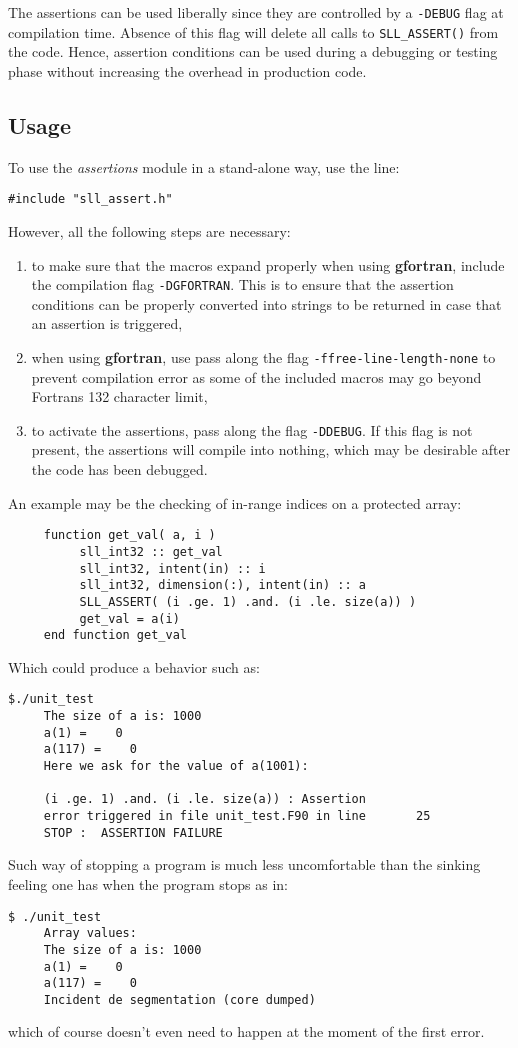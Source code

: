 \documentclass[]{report}   %
\begin{document}
The assertions can be used liberally since they are controlled by a \verb+-DEBUG+ flag at compilation time. Absence of this flag will delete all calls to \verb+SLL_ASSERT()+ from the code. Hence, assertion conditions can be used during a debugging or testing phase without increasing the overhead in production code.

\subsection{Usage}
To use the \emph{assertions} module in a stand-alone way, use the line:
\begin{verbatim}
#include "sll_assert.h"
\end{verbatim}
However, all the following steps are necessary:

\begin{enumerate}
\item to make sure that the macros expand properly when using \textbf{gfortran}, include the compilation flag \verb+-DGFORTRAN+. This is to ensure that the assertion conditions can be properly converted into strings to be returned in case that an assertion is triggered,
\item when using \textbf{gfortran}, use pass along the flag \verb+-ffree-line-length-none+ to prevent compilation error as some of the included macros may go beyond Fortrans 132 character limit,
\item to activate the assertions, pass along the flag \verb+-DDEBUG+. If this flag is not present, the assertions will compile into nothing, which may be desirable after the code has been debugged.
\end{enumerate}
An example may be the checking of in-range indices on a protected array:

\begin{verbatim}
     function get_val( a, i )
          sll_int32 :: get_val
          sll_int32, intent(in) :: i
          sll_int32, dimension(:), intent(in) :: a
          SLL_ASSERT( (i .ge. 1) .and. (i .le. size(a)) )
          get_val = a(i)
     end function get_val
\end{verbatim}
Which could produce a behavior such as:
\begin{verbatim}
$./unit_test
     The size of a is: 1000
     a(1) =    0
     a(117) =    0
     Here we ask for the value of a(1001):

     (i .ge. 1) .and. (i .le. size(a)) : Assertion 
     error triggered in file unit_test.F90 in line       25
     STOP :  ASSERTION FAILURE
\end{verbatim}
Such way of stopping a program is much less uncomfortable than the sinking feeling one has when the program stops as in:
\begin{verbatim}
$ ./unit_test
     Array values: 
     The size of a is: 1000
     a(1) =    0
     a(117) =    0
     Incident de segmentation (core dumped)
\end{verbatim}
which of course doesn't even need to happen at the moment of the first error.
\end{document}
